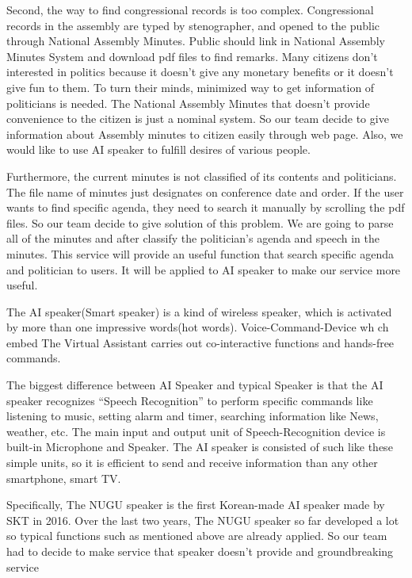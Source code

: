 \documentclass[conference]{IEEEtran}
\begin{document}
Second, the way to find congressional records is too complex. Congressional records in the assembly are typed by stenographer, and opened to the public through National Assembly Minutes. Public should link in National Assembly Minutes System and download pdf files to find remarks. Many citizens don’t interested in politics because it doesn’t give any monetary benefits or it doesn’t give fun to them. To turn their minds, minimized way to get information of politicians is needed. The National Assembly Minutes that doesn’t provide convenience to the citizen is just a nominal system. So our team decide to give information about Assembly minutes to citizen easily through web page. Also, we would like to use AI speaker to fulfill desires of various people.
 
Furthermore, the current minutes is not classified of its contents and politicians. The file name of minutes just designates on conference date and order. If the user wants to find specific agenda, they need to search it manually by scrolling the pdf files. So our team decide to give solution of this problem. We are going to parse all of the minutes and after classify the politician’s agenda and speech in the minutes. This service will provide an useful function that search specific agenda and politician to users. It will be applied to AI speaker to make our service more useful.
 
The AI speaker(Smart speaker) is a kind of wireless speaker, which is activated by more than one impressive words(hot words). Voice-Command-Device wh ch embed The Virtual Assistant carries out co-interactive functions and hands-free commands.
 
The biggest difference between AI Speaker and typical Speaker is that the AI speaker recognizes “Speech Recognition” to perform specific commands like listening to music, setting alarm and timer, searching information like News, weather, etc. The main input and output unit of Speech-Recognition device is built-in Microphone and Speaker. The AI speaker is consisted of such like these simple units, so it is efficient to send and receive information than any other smartphone, smart TV.
 
Specifically, The NUGU speaker is the first Korean-made AI speaker made by SKT in 2016. Over the last two years, The NUGU speaker so far developed a lot so typical functions such as mentioned above are already applied. So our team had to decide to make service that speaker doesn’t provide and groundbreaking service
 
\end{document}
